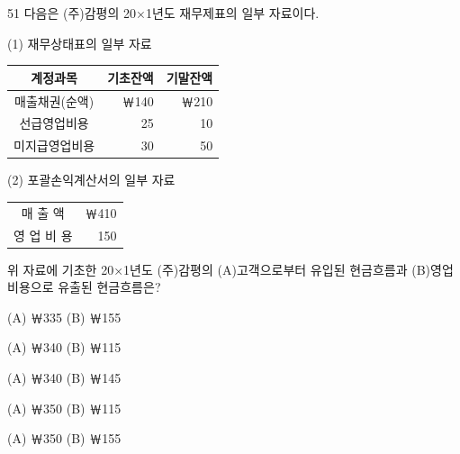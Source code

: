 \begin{question}{51}
다음은 (주)감평의 20×1년도 재무제표의 일부 자료이다.
\begin{framedtext}
(1) 재무상태표의 일부 자료 \par
{\small\centering\begin{tabular}{|c|r|r|}\hline
계정과목 & 기초잔액 & 기말잔액 \\ \hline
매출채권(순액) & ￦140 & ￦210 \\
선급영업비용 & 25 & 10 \\
미지급영업비용 & 30 & 50 \\ \hline
\end{tabular}\par}
(2) 포괄손익계산서의 일부 자료 \par
{\small\centering\begin{tabular}{|c|r|}\hline
매 출 액 & ￦410 \\
영 업 비 용 & 150 \\ \hline
\end{tabular}\par}
\end{framedtext}
위 자료에 기초한 20×1년도 (주)감평의 (A)고객으로부터 유입된 현금흐름과 (B)영업비용으로 유출된 현금흐름은?
\begin{choices}
  \item (A) ￦335 \quad (B) ￦155
  \item (A) ￦340 \quad (B) ￦115
  \item (A) ￦340 \quad (B) ￦145
  \item (A) ￦350 \quad (B) ￦115
  \item (A) ￦350 \quad (B) ￦155
\end{choices}
\end{question}
